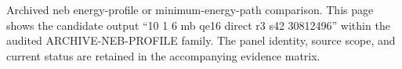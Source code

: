 Archived neb energy-profile or minimum-energy-path comparison. This page shows the candidate output ``10 1 6 mb qe16 direct r3 s42 30812496'' within the audited ARCHIVE-NEB-PROFILE family. The panel identity, source scope, and current status are retained in the accompanying evidence matrix.
